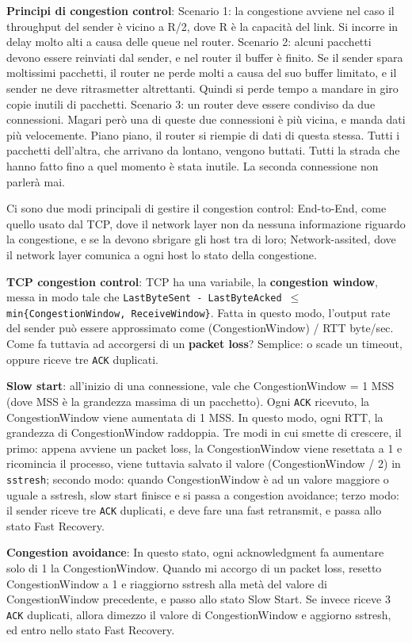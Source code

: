 \documentclass[a4paper,10pt]{article} %
\renewcommand{\b}[1]{%
    {\textbf{#1}}}
\renewcommand{\t}[1]{%
    {\texttt{#1}}}
\begin{document}
\b{Principi di congestion control}: Scenario 1: la congestione avviene nel caso il throughput del sender è vicino a R/2, dove R è la capacità del link. Si incorre in delay molto alti a causa delle queue nel router. Scenario 2: alcuni pacchetti devono essere reinviati dal sender, e nel router il buffer è finito. Se il sender spara moltissimi pacchetti, il router ne perde molti a causa del suo buffer limitato, e il sender ne deve ritrasmetter altrettanti. Quindi si perde tempo a mandare in giro copie inutili di pacchetti. Scenario 3: un router deve essere condiviso da due connessioni. Magari però una di queste due connessioni è più vicina, e manda dati più velocemente. Piano piano, il router si riempie di dati di questa stessa. Tutti i pacchetti dell'altra, che arrivano da lontano, vengono buttati. Tutti la strada che hanno fatto fino a quel momento è stata inutile. La seconda connessione non parlerà mai.

Ci sono due modi principali di gestire il congestion control: End-to-End, come quello usato dal TCP, dove il network layer non da nessuna informazione riguardo la congestione, e se la devono sbrigare gli host tra di loro; Network-assited, dove il network layer comunica a ogni host lo stato della congestione. 

\b{TCP congestion control}: TCP ha una variabile, la \b{congestion window}, messa in modo tale che \t{LastByteSent - LastByteAcked $\leq$ min\{CongestionWindow, ReceiveWindow\}}. Fatta in questo modo, l'output rate del sender può essere approssimato come (CongestionWindow) / RTT byte/sec. Come fa tuttavia ad accorgersi di un \b{packet loss}? Semplice: o scade un timeout, oppure riceve tre \t{ACK} duplicati. 

\b{Slow start}: all'inizio di una connessione, vale che CongestionWindow = 1 MSS (dove MSS è la grandezza massima di un pacchetto). Ogni \t{ACK} ricevuto, la CongestionWindow viene aumentata di 1 MSS. In questo modo, ogni RTT, la grandezza di CongestionWindow raddoppia. Tre modi in cui smette di crescere, il primo: appena avviene un packet loss, la CongestionWindow viene resettata a 1 e ricomincia il processo, viene tuttavia salvato il valore (CongestionWindow / 2) in \t{sstresh}; secondo modo: quando CongestionWindow è ad un valore maggiore o uguale a sstresh, slow start finisce e si passa a congestion avoidance; terzo modo: il sender riceve tre \t{ACK} duplicati, e deve fare una fast retransmit, e passa allo stato Fast Recovery. 

\b{Congestion avoidance}: In questo stato, ogni acknowledgment fa aumentare solo di 1 la CongestionWindow. Quando mi accorgo di un packet loss, resetto CongestionWindow a 1 e riaggiorno sstresh alla metà del valore di CongestionWindow precedente, e passo allo stato Slow Start. Se invece riceve 3 \t{ACK} duplicati, allora dimezzo il valore di CongestionWindow e aggiorno sstresh, ed entro nello stato Fast Recovery. 
\end{document}
